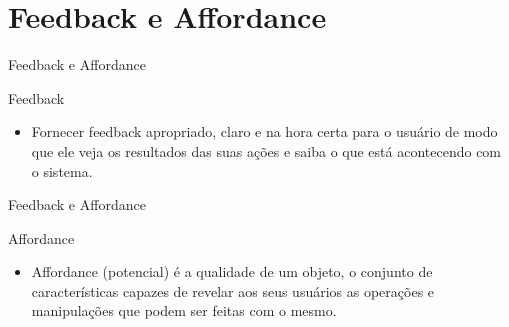 \section{Feedback e Affordance}

\begin{frame}{Feedback e Affordance}{}
\begin{block}{Feedback}
  \begin{itemize}
    \item<1-> Fornecer feedback apropriado, claro e na hora certa para o usuário de modo que ele veja os resultados das suas ações e saiba o que está acontecendo com o sistema.
  \end{itemize}
\end{block}
\end{frame}

\begin{frame}{Feedback e Affordance}
\begin{block}{Affordance}
  \begin{itemize}
    \item<1-> Affordance (potencial) é a qualidade de um objeto, o conjunto de características capazes de revelar aos seus usuários as operações e manipulações que podem ser feitas com o mesmo.
  \end{itemize}
\end{block}
\end{frame}
